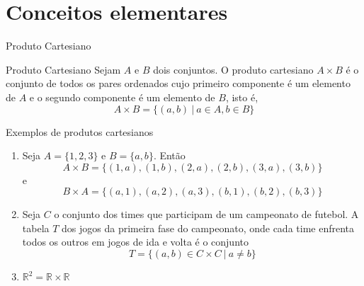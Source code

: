 \section{Conceitos elementares}

\begin{frame}[fragile]{Produto Cartesiano}

    \begin{block}{Produto Cartesiano}
        Sejam $A$ e $B$ dois conjuntos. O produto cartesiano $A\times B$ é o conjunto de todos
        os pares ordenados cujo primeiro componente é um elemento de $A$ e o segundo componente
        é um elemento de $B$, isto é,
        \[
            A\times B = \lbrace (a, b)\ |\ a\in A, b\in B\rbrace
        \]
    \end{block}

\end{frame}

\begin{frame}[fragile]{Exemplos de produtos cartesianos}

    \begin{enumerate}
        \item Seja $A = \lbrace 1, 2, 3\rbrace$ e $B = \lbrace a, b\rbrace$. Então
        \[
            A\times B = \lbrace (1, a), (1, b), (2, a), (2, b), (3, a), (3, b)\rbrace
        \]
        e
        \[
            B\times A = \lbrace (a, 1), (a, 2), (a, 3), (b, 1), (b, 2), (b, 3)\rbrace
        \]

        \item Seja $C$ o conjunto dos times que participam de um campeonato de futebol. A
            tabela $T$ dos jogos da primeira fase do campeonato, onde cada time enfrenta todos os
            outros em jogos de ida e volta é o conjunto
        \[
            T = \lbrace (a, b)\in C\times C\ |\ a\neq b\rbrace
        \]

        \item $\mathbb{R}^2 = \mathbb{R}\times \mathbb{R}$
    \end{enumerate}

\end{frame}

